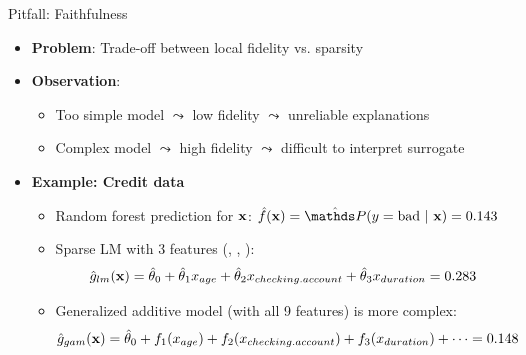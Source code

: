 \documentclass[10pt,compress,t,notes=noshow, xcolor=table]{beamer}
\newcommand{\gh}{\hat{g}}
\begin{document}
\begin{frame}{Pitfall: Faithfulness}
\begin{itemize}
	\item \textbf{Problem}: Trade-off between local fidelity vs. sparsity
	\item \textbf{Observation}:
    \begin{itemize}
        \item Too simple model $\leadsto$ low fidelity $\leadsto$ unreliable explanations
        \item Complex model $\leadsto$ high fidelity $\leadsto$ difficult to interpret surrogate %
    \end{itemize}
	\pause
	\item \textbf{Example: Credit data} 
	\begin{itemize}
	\itemsep0em
	    \item Random forest prediction for $\mathbf{x}$: 
	    $\fh(\xv) = \hat{\P}(y = \text{bad} ~|~ \xv) = 0.143$
	    \item %
	    Sparse LM with 3 features (, , ):
	    $$\gh_{lm}(\xv) = \thetah_0 + \thetah_1 x_{age} + \thetah_2 x_{checking.account} + \thetah_3 x_{duration} = 0.283$$
	    \item Generalized additive model (with all 9 features) is more complex:
    $$%
    \gh_{gam}(\xv) = \thetah_0 + f_{1}(x_{age}) + f_{2}(x_{checking.account}) + f_{3}(x_{duration}) +  \dots %
    = 0.148$$
	\end{itemize}
\end{itemize}

\end{frame}
\end{document}
